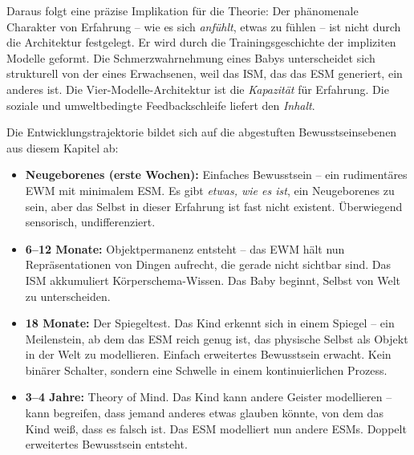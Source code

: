 \documentclass[11pt, twoside, openright]{book}
\begin{document}
Daraus folgt eine präzise Implikation für die Theorie: Der phänomenale Charakter von Erfahrung -- wie es sich \textit{anfühlt}, etwas zu fühlen -- ist nicht durch die Architektur festgelegt. Er wird durch die Trainingsgeschichte der impliziten Modelle geformt. Die Schmerzwahrnehmung eines Babys unterscheidet sich strukturell von der eines Erwachsenen, weil das ISM, das das ESM generiert, ein anderes ist. Die Vier-Modelle-Architektur ist die \textit{Kapazität} für Erfahrung. Die soziale und umweltbedingte Feedbackschleife liefert den \textit{Inhalt}.

Die Entwicklungstrajektorie bildet sich auf die abgestuften Bewusstseinsebenen aus diesem Kapitel ab:

\begin{itemize}
  \item \textbf{Neugeborenes (erste Wochen):} Einfaches Bewusstsein -- ein rudimentäres EWM mit minimalem ESM. Es gibt \textit{etwas, wie es ist}, ein Neugeborenes zu sein, aber das Selbst in dieser Erfahrung ist fast nicht existent. Überwiegend sensorisch, undifferenziert.
\end{itemize}

\begin{itemize}
  \item \textbf{6--12 Monate:} Objektpermanenz entsteht -- das EWM hält nun Repräsentationen von Dingen aufrecht, die gerade nicht sichtbar sind. Das ISM akkumuliert Körperschema-Wissen. Das Baby beginnt, Selbst von Welt zu unterscheiden.
\end{itemize}

\begin{itemize}
  \item \textbf{18 Monate:} Der Spiegeltest. Das Kind erkennt sich in einem Spiegel -- ein Meilenstein, ab dem das ESM reich genug ist, das physische Selbst als Objekt in der Welt zu modellieren. Einfach erweitertes Bewusstsein erwacht. Kein binärer Schalter, sondern eine Schwelle in einem kontinuierlichen Prozess.
\end{itemize}

\begin{itemize}
  \item \textbf{3--4 Jahre:} Theory of Mind. Das Kind kann andere Geister modellieren -- kann begreifen, dass jemand anderes etwas glauben könnte, von dem das Kind weiß, dass es falsch ist. Das ESM modelliert nun andere ESMs. Doppelt erweitertes Bewusstsein entsteht.
\end{itemize}
\end{document}
